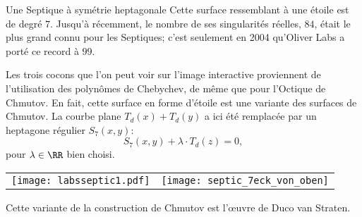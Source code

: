 \begin{surferPage}{Une Septique à symétrie heptagonale}
    Cette surface ressemblant à une étoile est de degré $7$.
    Jusqu'à récemment, le nombre de ses singularités réelles, $84$,
    était le plus grand connu pour les Septiques;
    c'est seulement en 2004 qu'Oliver Labs a porté ce record à $99$.
  
  
 Les trois cocons que l'on peut voir sur l'image interactive 
    proviennent de l'utilisation des polynômes de Chebychev, de même que pour l'Octique de Chmutov.
    En fait, cette surface en forme d'étoile est une variante des surfaces de Chmutov.
    La courbe plane $T_d(x)+T_d(y)$ a ici été remplacée par un heptagone régulier
    $S_7(x,y)$: 
   \[S_7(x,y) + \lambda \cdot T_d(z) = 0,\]
    pour $\lambda\in\RR$ bien choisi. 
    \vspace*{-0.3em}
    \begin{center}
      \begin{tabular}{c@{\qquad}c}
        \texttt{[image: labsseptic1.pdf]}
        &
        \texttt{[image: septic\_7eck\_von\_oben]}
      \end{tabular}
    \end{center}
    \vspace*{-0.3em}   
   Cette variante de la construction de Chmutov est l'œuvre de Duco van Straten.
\end{surferPage}
